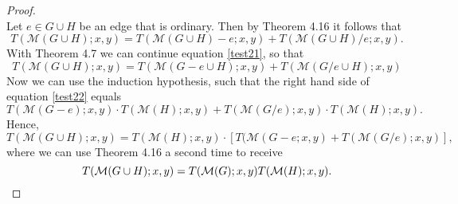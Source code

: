 \documentclass[12pt,a4paper, twoside, autooneside=false]{scrartcl}
\theoremstyle{definition}
\theoremstyle{remark}
\numberwithin{equation}{section}
\newcommand{\M}{\mathcal{M}} %
\begin{document}
\begin{proof}
\[\]
Let $e \in G \cup H$ be an edge that is ordinary. Then by Theorem 4.16 it follows that
\begin{equation}\label{test21}
T(\M(G \cup H);x,y) = T(\M(G \cup H) - e;x,y) + T(\M(G \cup H)/e;x,y).
\end{equation}
With Theorem 4.7 we can continue equation \eqref{test21}, so that 
\begin{equation} \label{test22}
T(\M(G \cup H);x,y) = T(\M(G - e \cup H);x,y) + T(\M(G/e \cup H);x,y) 
\end{equation}
Now we can use the induction hypothesis, such that the right hand side of equation \eqref{test22} equals 
\begin{equation}
T(\M(G - e);x,y) \cdot T(\M(H);x,y) + T(\M(G/e);x,y) \cdot T(\M(H);x,y).
\end{equation}
Hence, 
\[
T(\M(G \cup H);x,y) = T(\M(H);x,y) \cdot \left[T(\M(G - e;x,y) + T(\M(G/e);x,y)\right]
,
\]
where we can use Theorem 4.16 a second time to receive 
\[
T(\M(G \cup H);x,y) = T(\M(G);x,y) T(\M(H);x,y). \qedhere
\] 
\end{proof}
\end{document}
